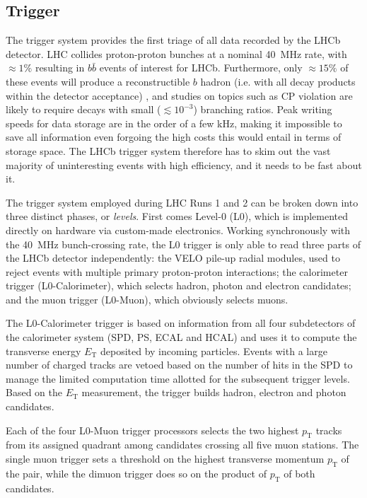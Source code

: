 \subsection{Trigger}
The trigger system \cite{Antunes-Nobrega:630828} provides the first triage of all data recorded by the LHCb detector.
LHC collides proton-proton bunches at a nominal \SI{40}{\mega\hertz} rate, with $\approx 1\%$ resulting in $b\bar{b}$ events of interest for LHCb.
Furthermore, only $\approx 15\%$ of these events will produce a reconstructible $b$ hadron (i.e. with all decay products within the detector acceptance) \cite{HistoryLHCb}, and studies on topics such as CP violation are likely to require decays with small ($\lesssim {10}^{-3}$) branching ratios.
Peak writing speeds for data storage are in the order of a few \si{\kilo\hertz}, making it impossible to save all information even forgoing the high costs this would entail in terms of storage space.
The LHCb trigger system therefore has to skim out the vast majority of uninteresting events with high efficiency, and it needs to be fast about it.

The trigger system employed during LHC Runs 1 and 2 can be broken down into three distinct phases, or \textit{levels}.
First comes Level-0 (L0), which is implemented directly on hardware via custom-made electronics.
Working synchronously with the \SI{40}{\mega\hertz} bunch-crossing rate, the L0 trigger is only able to read three parts of the LHCb detector independently: the VELO pile-up radial modules, used to reject events with multiple primary proton-proton interactions; the calorimeter trigger (L0-Calorimeter), which selects hadron, photon and electron candidates; and the muon trigger (L0-Muon), which obviously selects muons.

The L0-Calorimeter trigger is based on information from all four subdetectors of the calorimeter system (SPD, PS, ECAL and HCAL) and uses it to compute the transverse energy $E_\text{T}$ deposited by incoming particles.
Events with a large number of charged tracks are vetoed based on the number of hits in the SPD to manage the limited computation time allotted for the subsequent trigger levels.
Based on the $E_\text{T}$ measurement, the trigger builds hadron, electron and photon candidates.

Each of the four L0-Muon trigger processors selects the two highest $p_\text{T}$ tracks from its assigned quadrant among candidates crossing all five muon stations.
The single muon trigger sets a threshold on the highest transverse momentum $p_\text{T}$ of the pair, while the dimuon trigger does so on the product of $p_\text{T}$ of both candidates.

